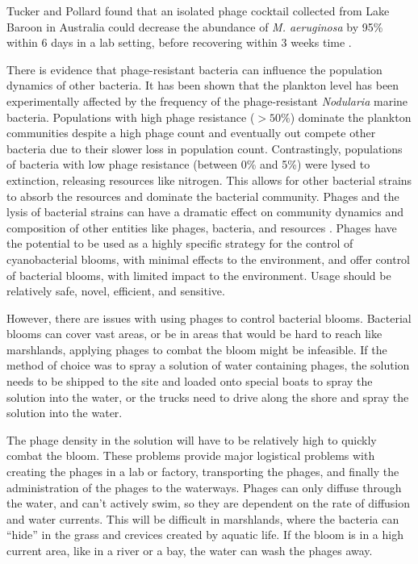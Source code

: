 Tucker and Pollard found that an isolated phage cocktail collected from Lake Baroon in Australia could decrease the abundance of \textit{M. aeruginosa} by 95\% within 6 days in a lab setting, before recovering within 3 weeks time \cite{tuckerIdentificationCyanophageMaLBP2005}. 

There is evidence that phage-resistant bacteria can influence the population dynamics of other bacteria.
It has been shown that the plankton level has been experimentally affected by the frequency of the phage-resistant \textit{Nodularia} marine bacteria.
Populations with high phage resistance ($>50\%$) dominate the plankton communities despite a high phage count and eventually out compete other bacteria due to their slower loss in population count.
Contrastingly, populations of bacteria with low phage resistance (between 0\% and 5\%) were lysed to extinction, releasing resources like nitrogen.
This allows for other bacterial strains to absorb the resources and dominate the bacterial community.
Phages and the lysis of bacterial strains can have a dramatic effect on community dynamics and composition of other entities like phages, bacteria, and resources \cite{colomaFrequencyVirusresistantHosts2019}.
Phages have the potential to be used as a highly specific strategy for the control of cyanobacterial blooms, with minimal effects to the environment, and offer control of bacterial blooms, with limited impact to the environment.
Usage should be relatively safe, novel, efficient, and sensitive.  

However, there are issues with using phages to control bacterial blooms.
Bacterial blooms can cover vast areas, or be in areas that would be hard to reach like marshlands, applying phages to combat the bloom might be infeasible.
If the method of choice was to spray a solution of water containing phages, the solution needs to be shipped to the site and loaded onto special boats to spray the solution into the water, or the trucks need to drive along the shore and spray the solution into the water.

The phage density in the solution will have to be relatively high to quickly combat the bloom.
These problems provide major logistical problems with creating the phages in a lab or factory, transporting the phages, and finally the administration of the phages to the waterways.
Phages can only diffuse through the water, and can't actively swim, so they are dependent on the rate of diffusion and water currents.
This will be difficult in marshlands, where the bacteria can “hide” in the grass and crevices created by aquatic life.
If the bloom is in a high current area, like in a river or a bay, the water can wash the phages away.

